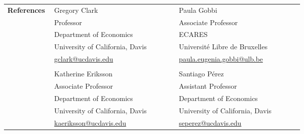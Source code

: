 \documentclass[a4paper,11pt,oneside]{article}
\begin{document}
    \noindent \begin{longtable}{@{} p{0.15\linewidth} p{0.4\linewidth} p{0.4\linewidth}}
     \textbf{\large{References}}    &     Gregory Clark  & Paula Gobbi \\

     & Professor &  Associate Professor \\
     & Department of Economics & ECARES \\
     & University of California, Davis & Universit\'{e} Libre de Bruxelles  \\
     & \href{mailto:gclark@ucdavis.edu}{gclark@ucdavis.edu}  & \href{mailto:paula.eugenia.gobbi@ulb.be}{paula.eugenia.gobbi@ulb.be}  \\
     \\
     &  Katherine Eriksson  & Santiago P\'{e}rez  \\
     & Associate Professor  &Assistant Professor  \\
     & Department of Economics &   Department of Economics \\
     & University of California, Davis & University of California, Davis  \\
     & \href{mailto:kaeriksson@ucdavis.edu}{kaeriksson@ucdavis.edu}& \href{mailto:seperez@ucdavis.edu}{seperez@ucdavis.edu}   \\
      \end{longtable}



\end{document}
